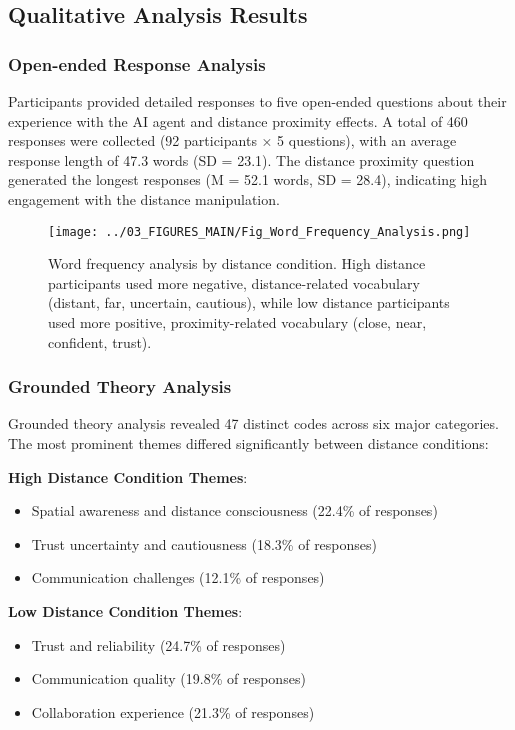\documentclass[12pt]{article}
\begin{document}
\subsection{Qualitative Analysis Results}

\subsubsection{Open-ended Response Analysis}

Participants provided detailed responses to five open-ended questions about their experience with the AI agent and distance proximity effects. A total of 460 responses were collected (92 participants × 5 questions), with an average response length of 47.3 words (SD = 23.1). The distance proximity question generated the longest responses (M = 52.1 words, SD = 28.4), indicating high engagement with the distance manipulation.

\begin{figure}[h]
\centering
\texttt{[image: ../03\_FIGURES\_MAIN/Fig\_Word\_Frequency\_Analysis.png]}
\caption{Word frequency analysis by distance condition. High distance participants used more negative, distance-related vocabulary (distant, far, uncertain, cautious), while low distance participants used more positive, proximity-related vocabulary (close, near, confident, trust).}
\label{fig:word_frequency_analysis}
\end{figure}

\subsubsection{Grounded Theory Analysis}

Grounded theory analysis revealed 47 distinct codes across six major categories. The most prominent themes differed significantly between distance conditions:

\textbf{High Distance Condition Themes}:
\begin{itemize}
    \item Spatial awareness and distance consciousness (22.4\% of responses)
    \item Trust uncertainty and cautiousness (18.3\% of responses)
    \item Communication challenges (12.1\% of responses)
\end{itemize}

\textbf{Low Distance Condition Themes}:
\begin{itemize}
    \item Trust and reliability (24.7\% of responses)
    \item Communication quality (19.8\% of responses)
    \item Collaboration experience (21.3\% of responses)
\end{itemize}
\end{document}
